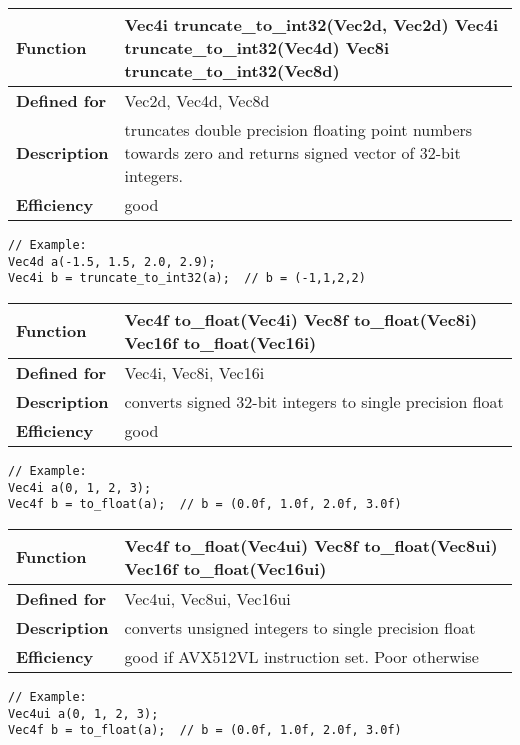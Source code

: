 \documentclass[vcl_manual.tex]{subfiles}
\begin{document}
\begin{tabular}{|p{30mm}|p{120mm}|}
\hline
\bfseries Function & 
Vec4i truncate\_to\_int32(Vec2d, Vec2d)\newline
Vec4i truncate\_to\_int32(Vec4d)\newline
Vec8i truncate\_to\_int32(Vec8d) \\ \hline
\bfseries Defined for & Vec2d, Vec4d, Vec8d \\ \hline
\bfseries Description & truncates double precision floating point numbers towards zero and returns signed vector of 32-bit integers. \\ \hline
\bfseries Efficiency & good \\ \hline
\end{tabular}
\begin{lstlisting}[frame=none]
// Example:
Vec4d a(-1.5, 1.5, 2.0, 2.9);
Vec4i b = truncate_to_int32(a);  // b = (-1,1,2,2)
\end{lstlisting}


\begin{tabular}{|p{30mm}|p{120mm}|}
\hline
\bfseries Function & 
Vec4f to\_float(Vec4i) \newline
Vec8f to\_float(Vec8i) \newline
Vec16f to\_float(Vec16i) \\ \hline
\bfseries Defined for & Vec4i, Vec8i, Vec16i \\ \hline
\bfseries Description & converts signed 32-bit integers to single precision float \\ \hline
\bfseries Efficiency & good \\ \hline
\end{tabular}
\begin{lstlisting}[frame=none]
// Example:
Vec4i a(0, 1, 2, 3);
Vec4f b = to_float(a);  // b = (0.0f, 1.0f, 2.0f, 3.0f)
\end{lstlisting}


\begin{tabular}{|p{30mm}|p{120mm}|}
\hline
\bfseries Function & 
Vec4f to\_float(Vec4ui) \newline
Vec8f to\_float(Vec8ui) \newline
Vec16f to\_float(Vec16ui) \\ \hline
\bfseries Defined for & Vec4ui, Vec8ui, Vec16ui \\ \hline
\bfseries Description & converts unsigned integers to single precision float \\ \hline
\bfseries Efficiency & good if AVX512VL instruction set. Poor otherwise \\ \hline
\end{tabular}
\begin{lstlisting}[frame=none]
// Example:
Vec4ui a(0, 1, 2, 3);
Vec4f b = to_float(a);  // b = (0.0f, 1.0f, 2.0f, 3.0f)
\end{lstlisting}
\end{document}
